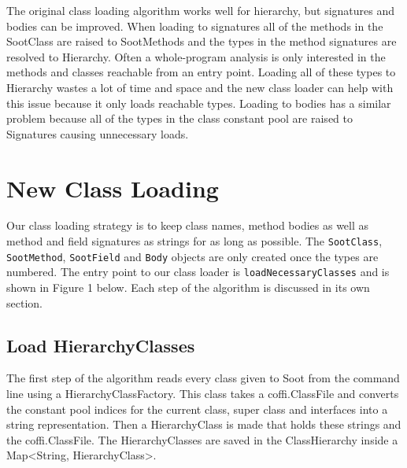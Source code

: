 \documentclass[preprint]{sigplanconf}
\begin{document}

The original class loading algorithm works well for hierarchy, but signatures and bodies can be improved. When loading to signatures all of the methods in the SootClass are raised to SootMethods and the types in the method signatures are resolved to Hierarchy. 
Often a whole-program analysis is only interested in the methods and classes reachable from an entry point. Loading all of these types to Hierarchy wastes a lot of time and space and the new class loader can help with this issue because it only loads reachable types. Loading to bodies has a similar problem because all of the types in the class constant pool are raised to Signatures causing unnecessary loads.


\section{New Class Loading}
\label{sec:new-cl}
Our class loading strategy is to keep class names, method bodies as well as method and field signatures as strings for as long as possible. The {\tt SootClass}, {\tt SootMethod}, {\tt SootField} and {\tt Body} objects are only created once the types are numbered. The entry point to our class loader is {\tt loadNecessaryClasses} and is shown in Figure 1 below. Each step of the algorithm is discussed in its own section.

\subsection{Load HierarchyClasses}
The first step of the algorithm reads every class given to Soot from the command line using a HierarchyClassFactory. This class takes a coffi.ClassFile and converts the constant pool indices for the current class, super class and interfaces into a string representation. Then a HierarchyClass is made that holds these strings and the coffi.ClassFile. The HierarchyClasses are saved in the ClassHierarchy inside a Map<String, HierarchyClass>.
\end{document}
